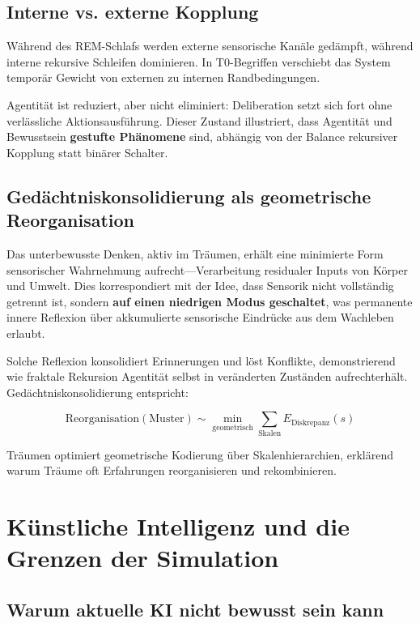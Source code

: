 	\subsection{Interne vs. externe Kopplung}
	
	Während des REM-Schlafs werden externe sensorische Kanäle gedämpft, während interne rekursive Schleifen dominieren. In T0-Begriffen verschiebt das System temporär Gewicht von externen zu internen Randbedingungen.
	
	Agentität ist reduziert, aber nicht eliminiert: Deliberation setzt sich fort ohne verlässliche Aktionsausführung. Dieser Zustand illustriert, dass Agentität und Bewusstsein \textbf{gestufte Phänomene} sind, abhängig von der Balance rekursiver Kopplung statt binärer Schalter.
	
	\subsection{Gedächtniskonsolidierung als geometrische Reorganisation}
	
	Das unterbewusste Denken, aktiv im Träumen, erhält eine minimierte Form sensorischer Wahrnehmung aufrecht—Verarbeitung residualer Inputs von Körper und Umwelt. Dies korrespondiert mit der Idee, dass Sensorik nicht vollständig getrennt ist, sondern \textbf{auf einen niedrigen Modus geschaltet}, was permanente innere Reflexion über akkumulierte sensorische Eindrücke aus dem Wachleben erlaubt.
	
	Solche Reflexion konsolidiert Erinnerungen und löst Konflikte, demonstrierend wie fraktale Rekursion Agentität selbst in veränderten Zuständen aufrechterhält. Gedächtniskonsolidierung entspricht:
	
	\[
	\text{Reorganisation}(\text{Muster}) \sim \min_{\text{geometrisch}} \sum_{\text{Skalen}} E_{\text{Diskrepanz}}(s)
	\]
	
	Träumen optimiert geometrische Kodierung über Skalenhierarchien, erklärend warum Träume oft Erfahrungen reorganisieren und rekombinieren.
	
	\section{Künstliche Intelligenz und die Grenzen der Simulation}
	
	\subsection{Warum aktuelle KI nicht bewusst sein kann}
	
